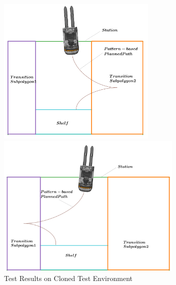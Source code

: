 \begin{figure}[H]
    \centering
    \begin{minipage}{0.45\textwidth}
        \centering
        \includegraphics[width=3in]{images/Chap3/station1_pattern.png} 
    \end{minipage}
    \begin{minipage}{0.45\textwidth}
        \centering
        \includegraphics[width=3.5in]{images/Chap3/station2_pattern.png}
    \end{minipage}
    \caption{Test Results on Cloned Test Environment}
    \label{Test_clone}
\end{figure}

